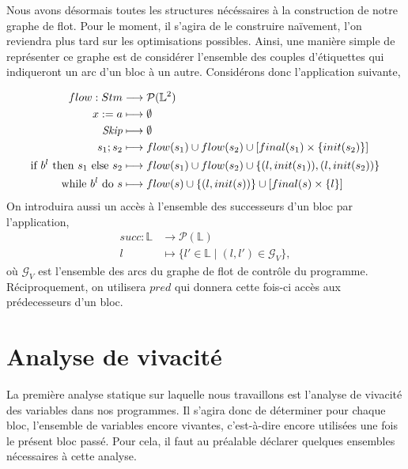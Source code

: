 \documentclass[a4paper, 12pt]{article}
\begin{document}
Nous avons désormais toutes les structures nécéssaires à la construction de notre graphe de flot. Pour le moment, il s'agira de 
le construire naïvement, l'on reviendra plus tard sur les optimisations possibles. Ainsi, une manière simple de représenter ce 
graphe est de considérer l'ensemble des couples d'étiquettes qui indiqueront un arc d'un bloc à un autre. 
Considérons donc l'application suivante, 

\begin{align*}
	flow : Stm &\longrightarrow \mathcal{P}(\mathbb{L}^2) \\
	{x}\space:=\space{a} &\longmapsto \emptyset \\
	\textit{Skip} &\longmapsto \emptyset \\
	{s_1}\space;\space{s_2} &\longmapsto flow(s_1) \cup flow(s_2) \cup [final(s_1)\times\{init(s_2)\}] \\
	\text{if }{b^l}\text{ then }{s_1}\text{ else }{s_2} &\longmapsto flow(s_1)\cup flow(s_2)\cup\{(l, init(s_1)),(l, init(s_2))\} \\
	\text{while }{b^l}\text{ do }{s} &\longmapsto flow(s)\cup\{(l,init(s))\}\cup[final(s)\times\{l\}]
\end{align*}
On introduira aussi un accès à l'ensemble des successeurs d'un bloc par l'application,
\begin{align*}
	succ : \mathbb{L} &\longrightarrow \mathcal{P}(\mathbb{L})\\
	l &\longmapsto \{l' \in \mathbb{L} \mid (l, l') \in \mathcal{G}_V\},
\end{align*}
où $\mathcal{G}_V$ est l'ensemble des arcs du graphe de flot de contrôle du programme. Réciproquement, on 
utilisera $pred$ qui donnera cette fois-ci accès aux prédecesseurs d'un bloc.

\section{Analyse de vivacité}
La première analyse statique sur laquelle nous travaillons est l'analyse de vivacité des variables dans nos programmes. 
Il s'agira donc de déterminer pour chaque bloc, l'ensemble de variables encore vivantes, c'est-à-dire
encore utilisées une fois le présent bloc passé. Pour cela, il faut au préalable déclarer quelques ensembles 
nécessaires à cette analyse.
\end{document}
